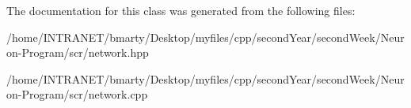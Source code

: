 The documentation for this class was generated from the following files\-:\begin{DoxyCompactItemize}
\item 
/home/\-I\-N\-T\-R\-A\-N\-E\-T/bmarty/\-Desktop/myfiles/cpp/second\-Year/second\-Week/\-Neuron-\/\-Program/scr/network.\-hpp\item 
/home/\-I\-N\-T\-R\-A\-N\-E\-T/bmarty/\-Desktop/myfiles/cpp/second\-Year/second\-Week/\-Neuron-\/\-Program/scr/network.\-cpp\end{DoxyCompactItemize}

